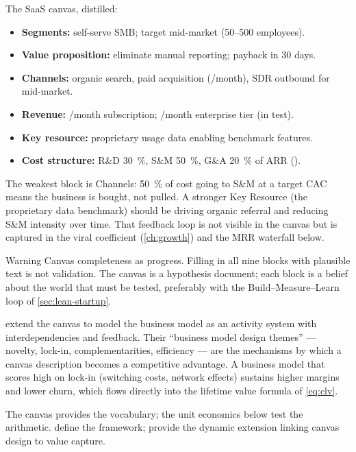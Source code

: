 \begin{example}
The SaaS canvas, distilled:
\begin{itemize}
  \item \textbf{Segments:} self-serve SMB; target mid-market (50--500 employees).
  \item \textbf{Value proposition:} eliminate manual reporting; payback in 30 days.
  \item \textbf{Channels:} organic search, paid acquisition (/month), SDR outbound for mid-market.
  \item \textbf{Revenue:} /month subscription; /month enterprise tier (in test).
  \item \textbf{Key resource:} proprietary usage data enabling benchmark features.
  \item \textbf{Cost structure:} R\&D \qty{30}{\percent}, S\&M \qty{50}{\percent}, G\&A \qty{20}{\percent} of ARR ().
\end{itemize}
The weakest block is Channels: \qty{50}{\percent} of cost going to S\&M at a  target CAC means the business is bought, not pulled. A stronger Key Resource (the proprietary data benchmark) should be driving organic referral and reducing S\&M intensity over time. That feedback loop is not visible in the canvas but is captured in the viral coefficient (\cref{ch:growth}) and the MRR waterfall below.
\end{example}

\begin{admonition}{Warning}
Canvas completeness as progress. Filling in all nine blocks with plausible text is not validation. The canvas is a hypothesis document; each block is a belief about the world that must be tested, preferably with the Build--Measure--Learn loop of \cref{sec:lean-startup}.
\end{admonition}

\textcite{zott2011business} extend the canvas to model the business model as an activity system with interdependencies and feedback. Their ``business model design themes'' --- novelty, lock-in, complementarities, efficiency --- are the mechanisms by which a canvas description becomes a competitive advantage. A business model that scores high on lock-in (switching costs, network effects) sustains higher margins and lower churn, which flows directly into the lifetime value formula of \cref{eq:clv}.

The canvas provides the vocabulary; the unit economics below test the arithmetic. \textcite{osterwalder2010} define the framework; \textcite{zott2011business} provide the dynamic extension linking canvas design to value capture.

